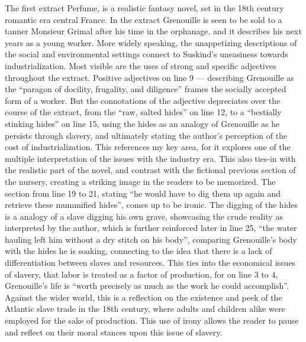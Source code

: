 \documentclass[a4paper,12pt]{article}
\begin{document}
The first extract Perfume, is a realistic fantasy novel, set in the 18th century romantic era central France. In the extract Grenouille is seen to be sold to a tanner Monsieur Grimal after his time in the orphanage, and it describes his next years as a young worker. More widely speaking, the unappetizing descriptions of the social and environmental settings connect to Suskind's uneasiness towards industrialization.
Most visible are the uses of strong and specific adjectives throughout the extract. Positive adjectives on line 9 --- describing Grenouille as the ``paragon of docility, frugality, and diligence'' frames the socially accepted form of a worker. But the connotations of the adjective depreciates over the course of the extract, from the ``raw, salted hides'' on line 12, to a ``bestially stinking hides'' on line 15, using the hides as an analogy of Grenouille as he persists through slavery, and ultimately stating the author's perception of the cost of industrialization. This references my key area, for it explores one of the multiple interpretation of the issues with the industry era. This also ties-in with the realistic part of the novel, and contrast with the fictional previous section of the nursery, creating a striking image in the readers to be memorized.
The section from line 19 to 21, stating ``he would have to dig them up again and retrieve these mummified hides'', comes up to be ironic. The digging of the hides is a analogy of a slave digging his own grave, showcasing the crude reality as interpreted by the author, which is further reinforced later in line 25, ``the water hauling left him without a dry stitch on his body'', comparing Grenouille's body with the hides he is soaking, connecting to the idea that there is a lack of differentiation between slaves and resources. This ties into the economical issues of slavery, that labor is treated as a factor of production, for on line 3 to 4, Grenouille's life is ``worth precisely as much as the work he could accomplish''. Against the wider world, this is a reflection on the existence and peek of the Atlantic slave trade in the 18th century, where adults and children alike were employed for the sake of production. This use of irony allows the reader to pause and reflect on their moral stances upon this issue of slavery.
\end{document}
